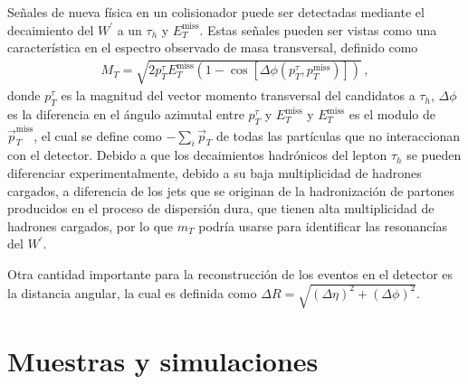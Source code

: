 Señales de nueva física en un colisionador puede ser detectadas mediante el decaimiento del $W^{\prime}$ a un $\tau_h$ y $E^{\text{miss}}_T$. Estas señales pueden ser vistas como una característica en el espectro observado de masa transversal, definido como
%
\begin{align*}
M_{T} = \sqrt{2p^{\tau}_{T} E^{\text{miss}}_{T}(1-\cos [\Delta \phi (p^{\tau}_{T},p^{\text{miss}}_{T})])}\,,
\end{align*}
%
donde $p^{\tau}_{T}$ es la magnitud del vector momento transversal del candidatos a $\tau_h$, $\Delta \phi$ es la diferencia en el ángulo azimutal entre $p^{\tau}_{T}$ y $E^{\text{miss}}_{T}$ y $E^{\text{miss}}_T$ es el modulo de $\vec{p}^{\text{miss}}_{T}$, el cual se define como $-\sum_{i} \vec{p}_{T}$ de todas las partículas que no interaccionan con el detector. Debido a que los decaimientos hadrónicos del lepton $\tau_h$ se pueden diferenciar experimentalmente, debido a su baja multiplicidad de hadrones cargados, a diferencia de los jets que se originan de la hadronización de partones producidos en el proceso de dispersión dura, que tienen alta multiplicidad de hadrones cargados, por lo que $m_{T}$ podría usarse para identificar las resonancías del $W^{\prime}$.

Otra cantidad importante para la reconstrucción de los eventos en el detector es la distancia angular, la cual es definida como $\Delta R = \sqrt{(\Delta \eta)^2+(\Delta \phi)^2 }$.

\section{Muestras y simulaciones}

